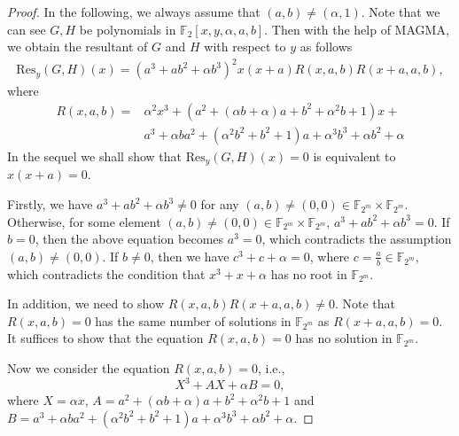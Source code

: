 \documentclass{article}
\def\f2{{\mathbb F}_{2}}
\def\fm{{\mathbb F}_{2^m}}
\begin{document}
{\begin{proof}
{In the following, we always assume that $(a,b)\neq(\alpha,1)$. Note that we can see $G, H$ be polynomials in $\f2 [x,y,\alpha, a,b]$. Then with the help of MAGMA, we obtain the resultant of $G$ and $H$ with respect to $y$ as follows } 
\begin{align}
	\mathrm{Res}_y(G,H)(x) = \left(a^3+ab^2+\alpha b^3\right)^2x(x+a) R(x,a,b)R(x+a,a,b),\label{resultant}
\end{align}
where 
\begin{align*}
	R(x,a,b) =& \alpha^2 x^3 + (a^2 + (\alpha  b + \alpha) a + b^2 +\alpha^2  b    +  1 ) x + \\
	& a^3+\alpha b a^2 + (\alpha^2 b^2 + b^2 +1) a + \alpha^3b^3+\alpha b^2 + \alpha 
\end{align*}
In the sequel we shall show that $\mathrm{Res}_y(G,H)(x)=0$ is equivalent to $x(x+a)=0$.

Firstly, we have $a^3+ab^2+\alpha b^3\neq 0$ for any $(a,b)\neq(0,0) \in \fm\times\fm$. Otherwise, for some element  $(a,b)\neq(0,0) \in  \fm\times\fm$, $a^3+ab^2+\alpha b^3 =0$. If $b=0$, then the above equation becomes $a^3=0$, which contradicts the assumption $(a,b)\neq(0,0)$. If $b\neq0$, then we have $c^3+c+ \alpha=0$, where $c=\frac{a}{b}\in\fm$, which contradicts the condition that $ x^{3}+x+\alpha$ has no root in $\mathbb{F}_{2^m}$. 

In addition, we need to show $R(x,a,b)R(x+a, a,b)\neq 0$. Note that $R(x,a,b)=0$ has the same number of solutions in $\fm$ as $R(x+a,a,b)=0$. It suffices to show that the equation $R(x,a,b)=0$ has no solution in $\fm$.  

	Now we consider the equation  $R(x,a,b)=0$, i.e.,
\begin{equation}
	\label{eq_3}
	X^3 + A X + \alpha B=0,
\end{equation} 
where $X = \alpha x$, $A = a^2 + (\alpha  b + \alpha) a + b^2 +\alpha^2  b  + 1 $ and $B= a^3+\alpha b a^2 + (\alpha^2 b^2 + b^2 +1) a + \alpha^3b^3+\alpha b^2 + \alpha.$  


\end{proof}}
\end{document}
